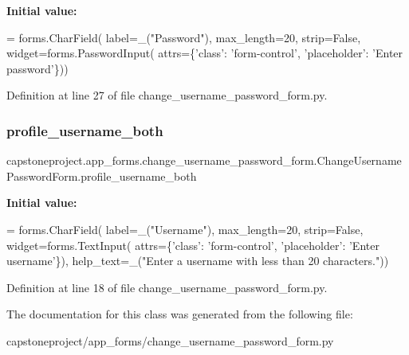 {\bfseries Initial value\+:}
\begin{DoxyCode}
=  forms.CharField(
        label=\_(\textcolor{stringliteral}{"Password"}),
        max\_length=20,
        strip=\textcolor{keyword}{False},
        widget=forms.PasswordInput(
            attrs=\{\textcolor{stringliteral}{'class'}: \textcolor{stringliteral}{'form-control'},
                   \textcolor{stringliteral}{'placeholder'}: \textcolor{stringliteral}{'Enter password'}\}))
\end{DoxyCode}


Definition at line 27 of file change\+\_\+username\+\_\+password\+\_\+form.\+py.

\mbox{\label{classcapstoneproject_1_1app__forms_1_1change__username__password__form_1_1_change_username_password_form_a5bcf0ed0c5b1372204d2227844a35eb3}} 
\subsubsection{\texorpdfstring{profile\+\_\+username\+\_\+both}{profile\_username\_both}}
{\footnotesize\ttfamily capstoneproject.\+app\+\_\+forms.\+change\+\_\+username\+\_\+password\+\_\+form.\+Change\+Username\+Password\+Form.\+profile\+\_\+username\+\_\+both\hspace{0.3cm}{\ttfamily [static]}}

{\bfseries Initial value\+:}
\begin{DoxyCode}
=  forms.CharField(
        label=\_(\textcolor{stringliteral}{"Username"}),
        max\_length=20,
        strip=\textcolor{keyword}{False},
        widget=forms.TextInput(
            attrs=\{\textcolor{stringliteral}{'class'}: \textcolor{stringliteral}{'form-control'},
                   \textcolor{stringliteral}{'placeholder'}: \textcolor{stringliteral}{'Enter username'}\}),
        help\_text=\_(\textcolor{stringliteral}{"Enter a username with less than 20 characters."}))
\end{DoxyCode}


Definition at line 18 of file change\+\_\+username\+\_\+password\+\_\+form.\+py.



The documentation for this class was generated from the following file\+:\begin{DoxyCompactItemize}
\item 
capstoneproject/app\+\_\+forms/change\+\_\+username\+\_\+password\+\_\+form.\+py\end{DoxyCompactItemize}
